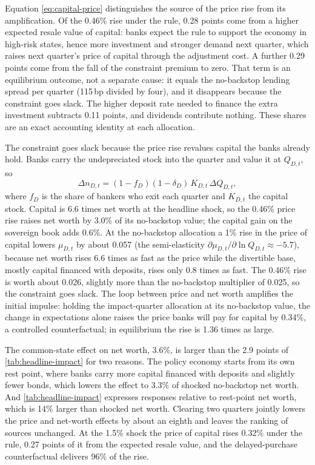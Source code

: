 Equation \eqref{eq:capital-price} distinguishes the source of the price rise from its
amplification. Of the 0.46\% rise under the rule, 0.28 points come from a higher expected resale
value of capital: banks expect the rule to support the economy in high-risk states, hence more
investment and stronger demand next quarter, which raises next quarter's price of capital
through the adjustment cost. A further 0.29 points come from the fall of the constraint premium
to zero. That term is an equilibrium outcome, not a separate cause: it equals the no-backstop
lending spread per quarter (115\,bp divided by four), and it disappears because the constraint
goes slack. The higher deposit rate needed to finance the extra investment subtracts 0.11 points,
and dividends contribute nothing. These shares are an exact accounting identity at each
allocation.

The constraint goes slack because the price rise revalues capital the banks already hold. Banks
carry the undepreciated stock into the quarter and value it at $Q_{D,t}$, so
\begin{equation}
\Delta n_{D,t}=(1-f_D)(1-\delta_D)\,K_{D,t}\,\Delta Q_{D,t},
\label{eq:revaluation}
\end{equation}
where $f_D$ is the share of bankers who exit each quarter and $K_{D,t}$ the capital stock.
Capital is 6.6 times net worth at the headline shock, so the 0.46\% price rise raises net worth
by 3.0\% of its no-backstop value; the capital gain on the sovereign book adds 0.6\%. At the
no-backstop allocation a 1\% rise in the price of capital lowers $\mu_{D,t}$ by about 0.057 (the
semi-elasticity $\partial\mu_{D,t}/\partial\ln Q_{D,t}\approx-5.7$), because net worth rises 6.6
times as fast as the price while the divertible base, mostly capital financed with deposits,
rises only 0.8 times as fast. The 0.46\% rise is worth about 0.026, slightly more than the
no-backstop multiplier of 0.025, so the constraint goes slack. The loop between price and net
worth amplifies the initial impulse: holding the impact-quarter allocation at its no-backstop
value, the change in expectations alone raises the price banks will pay for capital by 0.34\%, a
controlled counterfactual; in equilibrium the rise is 1.36 times as large.

The common-state effect on net worth, 3.6\%, is larger than the 2.9 points of
\cref{tab:headline-impact} for two reasons. The policy economy starts from its own rest point,
where banks carry more capital financed with deposits and slightly fewer bonds, which lowers the
effect to 3.3\% of shocked no-backstop net worth. And \cref{tab:headline-impact} expresses
responses relative to rest-point net worth, which is 14\% larger than shocked net worth. Clearing
two quarters jointly lowers the price and net-worth effects by about an eighth and leaves the
ranking of sources unchanged. At the 1.5\% shock the price of capital rises 0.32\% under the
rule, 0.27 points of it from the expected resale value, and the delayed-purchase counterfactual
delivers 96\% of the rise.


